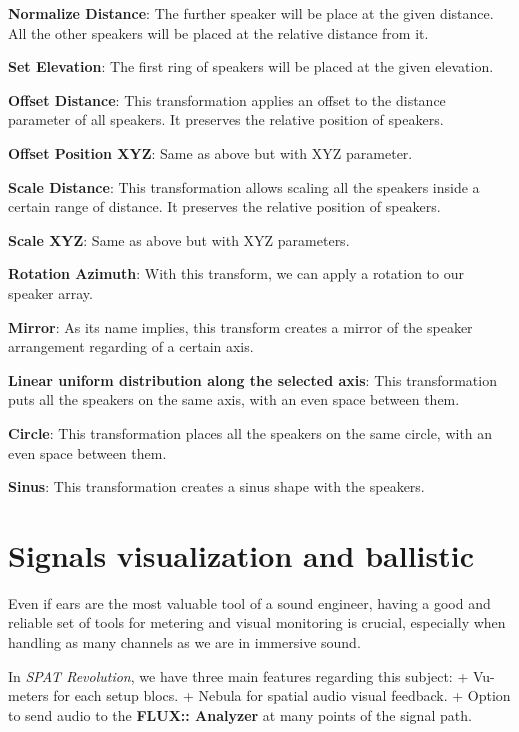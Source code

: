 \documentclass[
  letterpaper,
  DIV=11,
  numbers=noendperiod]{scrreport}
\begin{document}
\textbf{Normalize Distance}: The further speaker will be place at the
given distance. All the other speakers will be placed at the relative
distance from it.

\textbf{Set Elevation}: The first ring of speakers will be placed at the
given elevation.

\textbf{Offset Distance}: This transformation applies an offset to the
distance parameter of all speakers. It preserves the relative position
of speakers.

\textbf{Offset Position XYZ}: Same as above but with XYZ parameter.

\textbf{Scale Distance}: This transformation allows scaling all the
speakers inside a certain range of distance. It preserves the relative
position of speakers.

\textbf{Scale XYZ}: Same as above but with XYZ parameters.

\textbf{Rotation Azimuth}: With this transform, we can apply a rotation
to our speaker array.

\textbf{Mirror}: As its name implies, this transform creates a mirror of
the speaker arrangement regarding of a certain axis.

\textbf{Linear uniform distribution along the selected axis}: This
transformation puts all the speakers on the same axis, with an even
space between them.

\textbf{Circle}: This transformation places all the speakers on the same
circle, with an even space between them.

\textbf{Sinus}: This transformation creates a sinus shape with the
speakers.

\hypertarget{signals-visualization-and-ballistic}{%
\chapter{Signals visualization and
ballistic}\label{signals-visualization-and-ballistic}}

Even if ears are the most valuable tool of a sound engineer, having a
good and reliable set of tools for metering and visual monitoring is
crucial, especially when handling as many channels as we are in
immersive sound.

In \emph{SPAT Revolution}, we have three main features regarding this
subject: + Vu-meters for each setup blocs. + Nebula for spatial audio
visual feedback. + Option to send audio to the \textbf{FLUX:: Analyzer}
at many points of the signal path.
\end{document}
